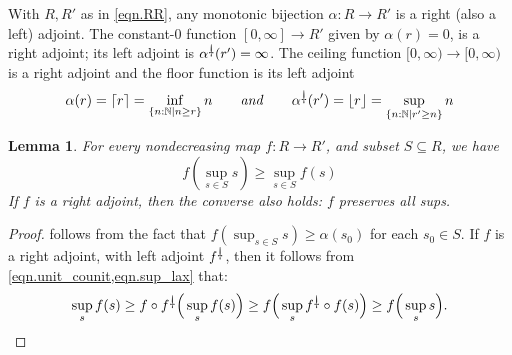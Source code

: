 \documentclass[11pt, one side, article]{memoir}
\theoremstyle{definition}
\theoremstyle{plain}
\newtheorem{lemma}[definitionx]{Lemma}
\newenvironment{example}
  {\pushQED{\qed}\renewcommand{\qedsymbol}{$\lozenge$}\examplex}
  {\popQED\endexamplex}
\renewcommand{\ss}{\subseteq}
\DeclarePairedDelimiter{\floor}{\lfloor}{\rfloor}
\DeclarePairedDelimiter{\ceil}{\lceil}{\rceil}
\newcommand{\ldag}{^{\rotatebox{180}{$\dagger$}}}
\newcommand{\tn}[1]{\textnormal{#1}}
\newcommand{\nn}{\mathbb{N}}
\newcommand{\hh}[2][]{#1 \tn{\textit{#2}} #1}
\newcommand{\qqand}{\hh[\qquad]{and}}
\begin{document}
\begin{example}
With $R,R'$ as in \eqref{eqn.RR}, any monotonic bijection $\alpha\colon R\to R'$ is a right (also a left) adjoint. The constant-$0$ function $[0,\infty]\to R'$ given by $\alpha(r)=0$, is a right adjoint; its left adjoint is $\alpha\ldag(r')=\infty$. The ceiling function $[0,\infty)\to[0,\infty)$ is a right adjoint and the floor function is its left adjoint
\[
	\alpha(r)=\ceil{r}=\inf_{\{n:\nn\mid n\geq r\}}n
	\qqand
	\alpha\ldag(r')=\floor{r}=\sup_{\{n:\nn\mid r'\geq n\}}n
\]
\end{example}

\begin{lemma}\label{lemma.radj_sups}
For every nondecreasing map $f\colon R\to R'$, and subset $S\ss R$, we have
\begin{equation}\label{eqn.sup_lax}
	f(\sup_{s\in S}s)
	\geq
	\sup_{s\in S}f(s)
\end{equation}
If $f$ is a right adjoint, then the converse also holds: $f$ preserves all sups.
\end{lemma}
\begin{proof}
	 follows from the fact that $f(\sup_{s\in S}s)\geq\alpha (s_0)$ for each $s_0\in S$. If $f$ is a right adjoint, with left adjoint $f\ldag$, then it follows from \cref{eqn.unit_counit,eqn.sup_lax} that:
	\[
	\sup_s f(s)\geq
	f\circ f\ldag\Big(\sup_s f(s)\Big)\geq
	f\Big(\sup_s f\ldag\circ f(s)\Big)\geq
	f\Big(\sup_s s\Big).
	\qedhere
	\]
\end{proof}
\end{document}

